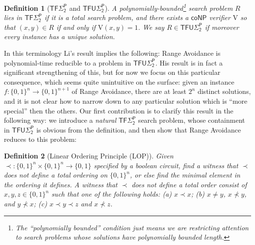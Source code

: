 \documentclass[11pt]{article}
\newtheorem{definition}{Definition}
\newcommand{\todo}[1]{\textcolor{red}{TODO: #1}}
\newcommand{\B}{\{0,1\}}
\begin{document}
\begin{definition}[$\mathsf{TF\Sigma_2^P}$ and $\mathsf{TFU\Sigma_2^P}$]
\label{def:TFUSigma2}
A polynomially-bounded\footnote{The ``polynomially bounded'' condition just means we are restricting attention to search problems whose solutions have polynomially bounded length.} search problem $R$ lies in $\mathsf{TF\Sigma_2^P}$ if it is a total search problem, and there exists a $\mathsf{coNP}$ verifier $\mathrm{V}$ so that $(x,y) \in R$ if and only if $\mathrm{V}(x,y)=1$. We say $R \in \mathsf{TFU\Sigma_2^P}$ if moreover every instance has a unique solution.
\end{definition}
In this terminology Li's result implies the following: Range Avoidance is polynomial-time reducible to a problem in $\mathsf{TFU\Sigma_2^P}$. His result is in fact a significant strengthening of this, but for now we focus on this particular consequence, which seems quite unintuitive on the surface: given an instance $f: \B^n \to \B^{n+1}$ of Range Avoidance, there are at least $2^{n}$ distinct solutions, and it is not clear how to narrow down to any particular solution which is ``more special'' then the others. Our first contribution is to clarify this result in the following way: we introduce a \emph{natural} $\mathsf{TF\Sigma_2^P}$ search problem, whose containment in $\mathsf{TFU\Sigma_2^P}$ is obvious from the definition, and then show that Range Avoidance reduces to this problem: 
\begin{definition}[Linear Ordering Principle (LOP)]\label{def:lop}
Given $\prec: \B^n \times \B^n \to \B$ specified by a boolean circuit, find a witness that $\prec$ does not define a total ordering on $\B^n$, or else find the minimal element in the ordering it defines. A witness that $\prec$ does not define a total order consist of $x,y,z \in \B^n$ such that one of the following holds: (a) $x \prec x$; (b) $x\neq y$, $x \not\prec y $, and $ y \not\prec x$; (c) $x \prec y \prec z$ and $x \not\prec z$.
\end{definition}
\end{document}
